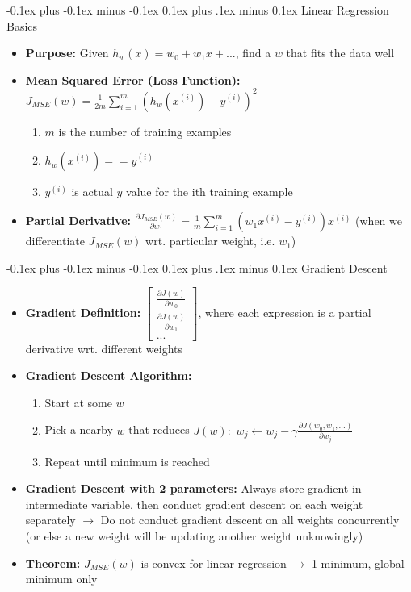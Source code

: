 \documentclass[landscape]{article}
\makeatletter
\renewcommand{\subsection}{\@startsection{subsection}{2}{0mm}%
  {-0.1ex plus -0.1ex minus -0.1ex}%
  {0.1ex plus .1ex minus 0.1ex}%
{\normalfont\scriptsize\bfseries}}
\makeatother
\begin{document}
\begin{multicols*}{5}
      \subsection{Linear Regression Basics}
        \begin{itemize}
          \item \textbf{Purpose:} Given $h_w(x) = w_0 + w_1x + ...$, find a $w$ that fits the data well
          \item \textbf{Mean Squared Error (Loss Function):} $J_{MSE}(w) = \frac{1}{2m}\sum^m_{ i=1}(h_w(x^{(i)})-y^{(i)})^2$
          \begin{enumerate}
            \item $m$ is the number of training examples
            \item $h_w(x^{(i)}) == \hat{y}^{(i)}$
            \item $y^{(i)}$ is actual $y$ value for the ith training example
          \end{enumerate}
          \item \textbf{Partial Derivative:} $\frac{\partial J_{MSE}(w)}{\partial w_1} = \frac{1}{m}\sum^m_{i=1}(w_1x^{(i)}-y^{(i)})x^{(i)}$ (when we differentiate $J_{MSE}(w)$ wrt. particular weight, i.e. $w_1$)
        \end{itemize}
      
        \subsection{Gradient Descent}
        \begin{itemize}
          \item \textbf{Gradient Definition:} $\begin{bmatrix} \frac{\partial J(w)}{\partial w_0} \\ \frac{\partial J(w)}{\partial w_1} \\ ... \end{bmatrix}$, where each expression is a partial derivative wrt. different weights
          \item \textbf{Gradient Descent Algorithm:}
          \begin{enumerate}
            \item Start at some $w$
            \item Pick a nearby $w$ that reduces $J(w):$ $w_j \leftarrow w_j - \gamma \frac{\partial J(w_0, w_1, ...)}{\partial w_j}$
            \item Repeat until minimum is reached
          \end{enumerate}
          \item \textbf{Gradient Descent with 2 parameters:} Always store gradient in intermediate variable, then conduct gradient descent on each weight separately $\rightarrow$ Do not conduct gradient descent on all weights concurrently (or else a new weight will be updating another weight unknowingly)
          \item \textbf{Theorem:} $J_{MSE}(w)$ is convex for linear regression $\rightarrow$ 1 minimum, global minimum only
        \end{itemize}


\end{multicols*}
\end{document}
